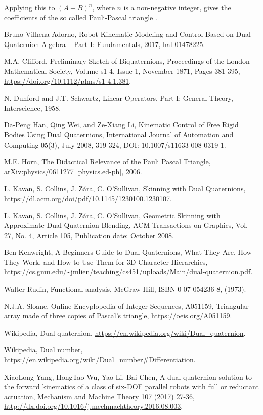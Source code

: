 \documentclass[12pt,reqno]{amsart}
\begin{document}
Applying this to $(A+B)^n$, where $n$ is a non-negative integer, gives the coefficients of the so called Pauli-Pascal triangle \cite{horn,sloane}.

\begin{thebibliography}{99}

 Bruno Vilhena Adorno, Robot Kinematic Modeling and Control Based on Dual Quaternion Algebra -- Part I: Fundamentals, 2017, hal-01478225.

 M.A. Clifford, Preliminary Sketch of Biquaternions, Proceedings of the London Mathematical Society, Volume s1-4, Issue 1, November 1871, Pages 381-395, \url{https://doi.org/10.1112/plms/s1-4.1.381}.

 N. Dunford and J.T. Schwartz, Linear Operators, Part I: General Theory, Interscience, 1958.

 Da-Peng Han, Qing Wei, and Ze-Xiang Li, Kinematic Control of Free Rigid Bodies Using Dual Quaternions, International Journal of Automation and Computing
05(3), July 2008, 319-324, DOI: 10.1007/s11633-008-0319-1.

 M.E. Horn, The Didactical Relevance of the Pauli Pascal Triangle, arXiv:physics/0611277 [physics.ed-ph], 2006.

 L. Kavan, S. Collins, J. \u Z\'ara, C. O'Sullivan, Skinning with Dual Quaternions, \url{https://dl.acm.org/doi/pdf/10.1145/1230100.1230107}.

 L. Kavan, S. Collins, J. \u Z\'ara, C. O'Sullivan, Geometric Skinning with Approximate Dual Quaternion Blending, ACM Transactions on Graphics, Vol. 27, No. 4, Article 105, Publication date: October 2008.

 Ben Kenwright, A Beginners Guide to Dual-Quaternions, What They Are, How They Work, and How to Use Them for 3D Character Hierarchies, \url{https://cs.gmu.edu/~jmlien/teaching/cs451/uploads/Main/dual-quaternion.pdf}.

 Walter Rudin, Functional analysis, McGraw-Hill, ISBN 0-07-054236-8, (1973).

 N.J.A. Sloane, Online Encyplopedia of Integer Sequences, A051159, Triangular array made of three copies of Pascal's triangle, \url{https://oeis.org/A051159}.

 Wikipedia, Dual quaternion, \url{https://en.wikipedia.org/wiki/Dual_quaternion}.

 Wikipedia, Dual number, \url{https://en.wikipedia.org/wiki/Dual_number#Differentiation}.

 XiaoLong Yang, HongTao Wu, Yao Li, Bai Chen, A dual quaternion solution to the forward kinematics of a class of six-DOF parallel robots with full or reductant actuation, Mechanism and Machine Theory 107 (2017) 27-36, \url{http://dx.doi.org/10.1016/j.mechmachtheory.2016.08.003}.
\end{thebibliography}
\end{document}
